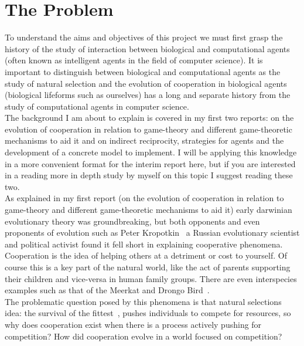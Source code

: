 \documentclass[]{final_report}
\begin{document}
\section{The Problem}
To understand the aims and objectives of this project we must first grasp the history of the study of interaction between biological and computational agents (often known as intelligent agents in the field of computer science). It is important to distinguish between biological and computational agents as the study of natural selection and the evolution of cooperation in biological agents (biological lifeforms such as ourselves) has a long and separate history from the study of computational agents in computer science.\\
The background I am about to explain is covered in my first two reports: on the evolution of cooperation in relation to game-theory and different game-theoretic mechanisms to aid it and on indirect reciprocity, strategies for agents and the development of a concrete model to implement. I will be applying this knowledge in a more convenient format for the interim report here, but if you are interested in a reading more in depth study by myself on this topic I suggest reading these two.\\
As explained in my first report (on the evolution of cooperation in relation to game-theory and different game-theoretic mechanisms to aid it) early darwinian evolutionary theory was groundbreaking, but both opponents and even proponents of evolution such as Peter Kropotkin~\cite{kropotkin1902mutual} a Russian evolutionary scientist and political activist found it fell short in explaining cooperative phenomena.\\
Cooperation is the idea of helping others at a detriment or cost to yourself. Of course this is a key part of the natural world, like the act of parents supporting their children and vice-versa in human family groups. There are even interspecies examples such as that of the Meerkat and Drongo Bird~\cite{bbcafrica}.\\
The problematic question posed by this phenomena is that natural selections idea: the survival of the fittest~\cite{spencer1864principles}, pushes individuals to compete for resources, so why does cooperation exist when there is a process actively pushing for competition? How did cooperation evolve in a world focused on competition?
\end{document}

